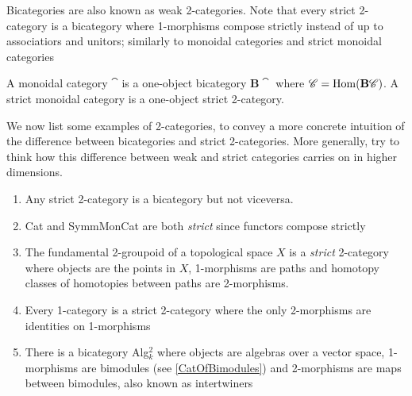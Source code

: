 Bicategories are also known as weak 2-categories. Note that every strict 2-category is a bicategory where 1-morphisms compose strictly instead of up to associatiors and unitors; similarly to monoidal categories and strict monoidal categories
\begin{ex}
    A monoidal category $\cat$ is a one-object bicategory $\mathbf{B}\cat$ where $\mathscr{C}=\operatorname{Hom}(\mathbf{B}\mathscr{C})$. A strict monoidal category is a one-object strict 2-category.
\end{ex}
We now list some examples of 2-categories, to convey a more concrete intuition of the difference between bicategories and strict 2-categories. More generally, try to think how this difference between weak and strict categories carries on in higher dimensions.
\begin{ex}
\hfill
    \begin{enumerate}
    \item Any strict 2-category is a bicategory but not viceversa.
        \item Cat and SymmMonCat are both \emph{strict} since functors compose strictly
        \item The fundamental 2-groupoid of a topological space $X$ is a \emph{strict} 2-category where objects are the points in $X$, 1-morphisms are paths and homotopy classes of homotopies between paths are 2-morphisms.
        \item Every 1-category is a strict 2-category where the only 2-morphisms are identities on 1-morphisms
        \item There is a bicategory Alg$_k^2$ where objects are algebras over a vector space, 1-morphisms are bimodules (see \ref{CatOfBimodules}) and 2-morphisms are maps between bimodules, also known as intertwiners 
    \end{enumerate}
\end{ex}

